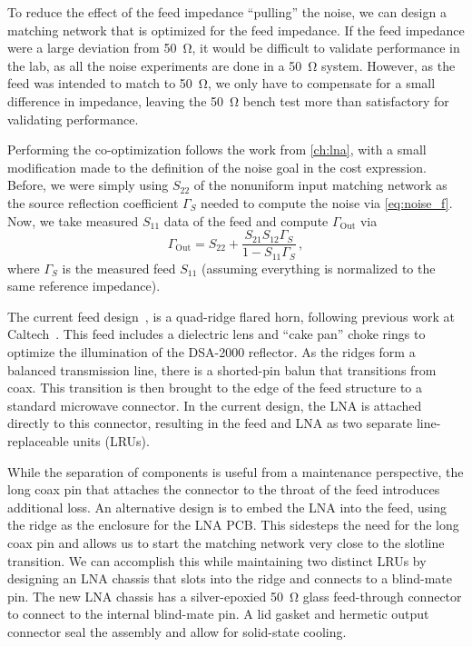 To reduce the effect of the feed impedance ``pulling'' the noise, we can design a matching network that is optimized for the feed impedance.
If the feed impedance were a large deviation from \qty{50}{\ohm}, it would be difficult to validate performance in the lab, as all the noise experiments are done in a \qty{50}{\ohm} system.
However, as the feed was intended to match to \qty{50}{\ohm}, we only have to compensate for a small difference in impedance, leaving the \qty{50}{\ohm} bench test more than satisfactory for validating performance.

Performing the co-optimization follows the work from \autoref{ch:lna}, with a small modification made to the definition of the noise goal in the cost expression.
Before, we were simply using $S_{22}$ of the nonuniform input matching network as the source reflection coefficient $\Gamma_S$ needed to compute the noise via \autoref{eq:noise_f}.
Now, we take measured $S_{11}$ data of the feed and compute $\Gamma_\text{Out}$ via
\begin{equation}
    \Gamma_\text{Out} = S_{22} + \frac{S_{21}S_{12}\Gamma_S}{1 - S_{11}\Gamma_S} \,,
\end{equation}
where $\Gamma_S$ is the measured feed $S_{11}$ (assuming everything is normalized to the same reference impedance).

The current feed design~\cite{flygareWidebandFeedReflector2023, flygareWidebandLowLossFeed2024}, is a quad-ridge flared horn, following previous work at Caltech~\cite{akgirayNewTechnologiesDriving2013}.
This feed includes a dielectric lens and ``cake pan'' choke rings to optimize the illumination of the DSA-2000 reflector.
As the ridges form a balanced transmission line, there is a shorted-pin balun that transitions from coax.
This transition is then brought to the edge of the feed structure to a standard microwave connector.
In the current design, the LNA is attached directly to this connector, resulting in the feed and LNA as two separate line-replaceable units (LRUs).

While the separation of components is useful from a maintenance perspective, the long coax pin that attaches the connector to the throat of the feed introduces additional loss.
An alternative design is to embed the LNA into the feed, using the ridge as the enclosure for the LNA PCB.
This sidesteps the need for the long coax pin and allows us to start the matching network very close to the slotline transition.
We can accomplish this while maintaining two distinct LRUs by designing an LNA chassis that slots into the ridge and connects to a blind-mate pin.
The new LNA chassis has a silver-epoxied \qty{50}{\ohm} glass feed-through connector to connect to the internal blind-mate pin.
A lid gasket and hermetic output connector seal the assembly and allow for solid-state cooling.

